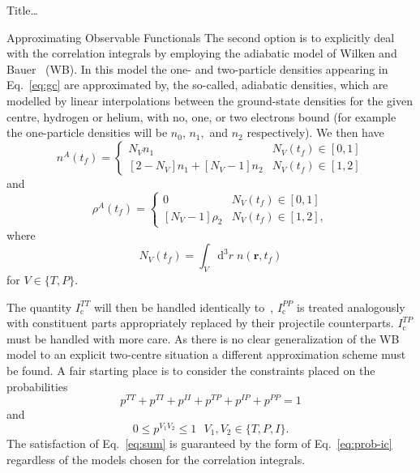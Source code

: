 \documentclass[letterpaper, 11 pt]{report}
\begin{document}
\begin{chapter}{ Title\dots \label{chap:p-he2p-he}}
\begin{section}{Approximating Observable Functionals \label{sec:phe2p-obs}}
      The second option is to explicitly deal with the correlation integrals by employing the adiabatic
      model of Wilken and Bauer~\cite{wb} (WB). In this model the one- and two-particle densities
      appearing in Eq.~\eqref{eq:gc} are approximated by, the so-called, adiabatic densities, which are
      modelled by linear interpolations between the ground-state densities for the given centre, hydrogen
      or helium, with no, one, or two electrons bound (for example the one-particle densities will be
      $n_0$, $ n_1,$ and $n_2$ respectively). We then have
      \begin{equation} \label{eq:n1a}
         n^{A} (t_f) = \begin{cases}
         N_V n_1 & N_V(t_f) \in [0,1] \\
         \left[ 2-N_V \right] n_1 + \left[ N_V-1 \right] n_2 & N_V(t_f) \in [1,2]
         \end{cases}
      \end{equation}
      and
      \begin{equation} \label{eq:p2a}
         \rho^{A} (t_f) =
         \begin{cases}
            0 & N_V(t_f) \in [0,1] \\
            \left[ N_V-1 \right] \rho_2 & N_V(t_f) \in [1,2],
         \end{cases}
      \end{equation}
      where
      \begin{equation} \label{eq:Nv}
         N_V(t_f) = \int_V \mathrm{d}^3 r \; n(\mathbf{r},t_f)
      \end{equation}
      for $V \in \{T,P\}$. 

      The quantity $I_\mathrm{c}^{TT}$ will then be handled identically to~\cite{pbarhe},
      $I_\mathrm{c}^{PP}$ is treated analogously with constituent parts appropriately replaced by their
      projectile counterparts. $I_\mathrm{c}^{TP}$ must be handled with more care. As there is no clear
      generalization of the WB model to an explicit two-centre situation a different approximation scheme
      must be found. A fair starting place is to consider the constraints placed on the probabilities
      \begin{equation} \label{eq:sum}
         p^{TT} + p^{TI} + p^{II} + p^{TP} + p^{IP} + p^{PP} = 1
      \end{equation}
      and
      \begin{equation} \label{eq:bound}
         0 \leq p^{V_1 V_2} \leq 1 ~ ~ ~ V_1, V_2 \in\{ T,P,I\}.
      \end{equation}
      The satisfaction of Eq.~\eqref{eq:sum} is guaranteed by the form of Eq.~\eqref{eq:prob-ic}
      regardless of the models chosen for the correlation integrals.


\end{section}
\end{chapter}
\end{document}
